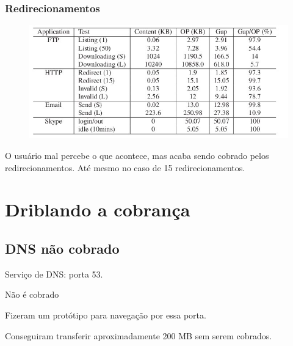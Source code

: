 \documentclass[brazil]{beamer}
\begin{document}
\begin{frame}[fragile]
    \frametitle{Redirecionamentos}
    \begin{figure}
    \begin{center}
        \includegraphics[scale=0.3]{images/applications.jpg}
    \end{center}
    \end{figure}
    O usuário mal percebe o que acontece, mas acaba sendo cobrado pelos redirecionamentos. Até mesmo no caso de 15 redirecionamentos.
\end{frame}

\section{Driblando a cobrança}

\subsection{DNS não cobrado}
\begin{frame}[fragile]
    Serviço de DNS: porta 53.

    \vspace{0.4cm}
    Não é cobrado

    \vspace{0.4cm}
    Fizeram um protótipo para navegação por essa porta.

    Conseguiram transferir aproximadamente 200 MB sem serem
    cobrados.

\end{frame}
\end{document}
